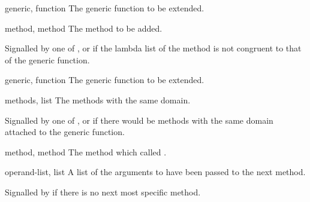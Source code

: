 \begin{optDefinition}
%
\begin{initoptions}
    \item[generic, function] The generic function to be extended.
    \item[method, method] The method to be added.
\end{initoptions}
%
\remarks%
Signalled by one of ,  or
 if the lambda list of the method is not congruent to
that of the generic function.

%
\begin{initoptions}
    \item[generic, function] The generic function to be extended.
    \item[methods, list] The methods with the same domain.
\end{initoptions}
%
\remarks%
Signalled by one of ,  or
 if there would be methods with the same domain
attached to the generic function.

%
\begin{initoptions}

    \item[method, method] The method which called .

    \item[operand-list, list] A list of the arguments to have been passed to the
    next method.
\end{initoptions}
%
\remarks%
Signalled by  if there is no next most specific
method.
%
\end{optDefinition}

